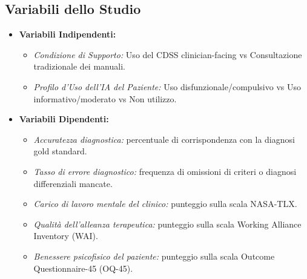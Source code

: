\documentclass[11pt,a4paper]{article}
\begin{document}
\subsection{Variabili dello Studio}
\begin{itemize}
    \item \textbf{Variabili Indipendenti:}
    \begin{itemize}
        \item \textit{Condizione di Supporto:} Uso del CDSS clinician-facing vs Consultazione tradizionale dei manuali.
        \item \textit{Profilo d'Uso dell'IA del Paziente:} Uso disfunzionale/compulsivo vs Uso informativo/moderato vs Non utilizzo.
    \end{itemize}
    \item \textbf{Variabili Dipendenti:}
    \begin{itemize}
        \item \textit{Accuratezza diagnostica:} percentuale di corrispondenza con la diagnosi gold standard.
        \item \textit{Tasso di errore diagnostico:} frequenza di omissioni di criteri o diagnosi differenziali mancate.
        \item \textit{Carico di lavoro mentale del clinico:} punteggio sulla scala NASA-TLX.
        \item \textit{Qualità dell'alleanza terapeutica:} punteggio sulla scala Working Alliance Inventory (WAI).
        \item \textit{Benessere psicofisico del paziente:} punteggio sulla scala Outcome Questionnaire-45 (OQ-45).
    \end{itemize}
\end{itemize}
\end{document}
